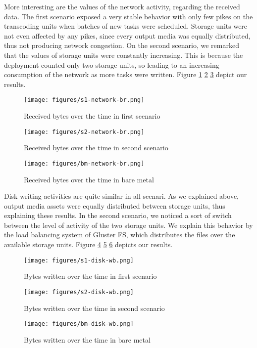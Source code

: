 \documentclass[a4paper, titlepage]{paper}
\numberwithin{figure}{section}
\numberwithin{table}{section}
\begin{document}
        More interesting are the values of the network activity, regarding the received data. The first scenario exposed a very stable behavior with only few pikes on the transcoding units when batches of new tasks were scheduled. Storage units were not even affected by any pikes, since every output media was equally distributed, thus not producing network congestion. On the second scenario, we remarked that the values of storage units were constantly increasing. This is because the deployment counted only two storage units, so leading to an increasing consumption of the network as more tasks were written. Figure \ref{s1nrb} \ref{s2nrb} \ref{bmnrb} depict our results.

        \begin{figure}
          \centering
          \texttt{[image: figures/s1-network-br.png]}
          \caption{Received bytes over the time in first scenario}
          \label{s1nrb}
        \end{figure}
        \begin{figure}
          \centering
          \texttt{[image: figures/s2-network-br.png]}
          \caption{Received bytes over the time in second scenario}
          \label{s2nrb}
        \end{figure}
        \begin{figure}
          \centering
          \texttt{[image: figures/bm-network-br.png]}
          \caption{Received bytes over the time in bare metal}
          \label{bmnrb}
        \end{figure}

        Disk writing activities are quite similar in all scenari. As we explained above, output media assets were equally distributed between storage units, thus explaining these results. In the second scenario, we noticed a sort of switch between the level of activity of the two storage units. We explain this behavior by the load balancing system of Gluster FS, which distributes the files over the available storage units. Figure \ref{s1dbw} \ref{s2dbw} \ref{bmdbw} depicts our results.

        \begin{figure}
          \centering
          \texttt{[image: figures/s1-disk-wb.png]}
          \caption{Bytes written over the time in first scenario}
          \label{s1dbw}
        \end{figure}
        \begin{figure}
          \centering
          \texttt{[image: figures/s2-disk-wb.png]}
          \caption{Bytes written over the time in second scenario}
          \label{s2dbw}
        \end{figure}
        \begin{figure}
          \centering
          \texttt{[image: figures/bm-disk-wb.png]}
          \caption{Bytes written over the time in bare metal}
          \label{bmdbw}
        \end{figure}
\end{document}
